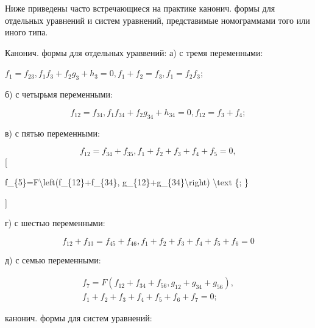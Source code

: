\documentclass[10pt]{article}
\begin{document}
Ниже приведены часто встречающиеся на практике канонич. формы для отдельных уравнений и систем уравнений, представимые номограммами того или иного типа.



Канонич. формы для отдельных ураввений: а) с тремя переменными:



$f_{1}=f_{23}, f_{1} f_{3}+f_{2} g_{3}+h_{3}=0, f_{1}+f_{2}=f_{3}, f_{1}=f_{2} f_{3} ;$



б) с четырьмя переменными:



\[

f_{12}=f_{34}, f_{1} f_{34}+f_{2} g_{34}+h_{34}=0, f_{12}=f_{3}+f_{4} ;

\]



в) с пятью переменными:



\[

f_{12}=f_{34}+f_{35}, f_{1}+f_{2}+f_{3}+f_{4}+f_{5}=0,

\][



f\_\{5\}=F\textbackslash left(f\_\{12\}+f\_\{34\}, g\_\{12\}+g\_\{34\}\textbackslash right) \textbackslash text \{; \}

]



г) с шестью переменными:



\[

f_{12}+f_{13}=f_{45}+f_{46}, f_{1}+f_{2}+f_{3}+f_{4}+f_{5}+f_{6}=0

\]



д) с семью переменными:



\[

\begin{gathered}

f_{7}=F\left(f_{12}+f_{34}+f_{56}, g_{12}+g_{34}+g_{56}\right), \\

f_{1}+f_{2}+f_{3}+f_{4}+f_{5}+f_{6}+f_{7}=0 ;

\end{gathered}

\]



канонич. формы для систем уравнений:
\end{document}
